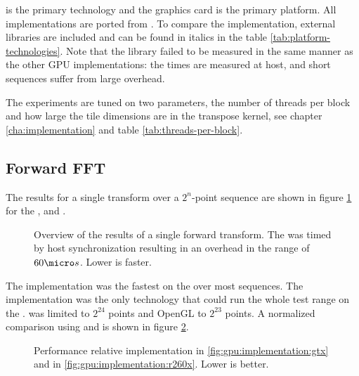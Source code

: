 {\CU} is the primary technology and the {\NVCARD} graphics card is the primary platform. All implementations are ported from {\CU}. To compare the implementation, external libraries are included and can be found in italics in the table \ref{tab:platform-technologies}. Note that the {\CLFFT} library failed to be measured in the same manner as the other GPU implementations: the times are measured at host, and short sequences suffer from large overhead.

The experiments are tuned on two parameters, the number of \glspl{thread} per \gls{block} and how large the tile dimensions are in the transpose \gls{kernel}, see chapter \ref{cha:implementation} and table \ref{tab:threads-per-block}.

\subsection{Forward FFT}

The results for a single transform over a $2^{n}$-point sequence are shown in figure \ref{fig:gpu:overview} for the {\NVCARD}, {\AMDCARD} and {\INTELCPU}.

\begin{figure}
	\centering
	\subfloat[\NVCARD]{	
		
	}
	\vfill
	\subfloat[\AMDCARD]{
		
	}
	\caption{Overview of the results of a single forward transform. The {\CLFFT} was timed by host synchronization resulting in an overhead in the range of $60{\micro}s$. Lower is faster.}
	\label{fig:gpu:overview}
\end{figure}

The {\CU} implementation was the fastest on the {\NVCARD} over most sequences. The {\OCL} implementation was the only technology that could run the whole test range on the {\AMDCARD}. {\DX} was limited to $2^{24}$ points and OpenGL to $2^{23}$ points. A normalized comparison using {\CU} and {\OCL} is shown in figure \ref{fig:gpu:implementation}.

\begin{figure}
	\centering
	\subfloat[\NVCARD\label{fig:gpu:implementation:gtx}]{	
		
	}
	\vfill
	\subfloat[\AMDCARD\label{fig:gpu:implementation:r260x}]{
		
	}	
	\caption{Performance relative {\CU} implementation in \ref{fig:gpu:implementation:gtx} and {\OCL} in \ref{fig:gpu:implementation:r260x}. Lower is better.}
	\label{fig:gpu:implementation}
\end{figure}

